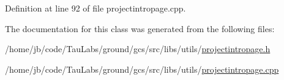 \-Definition at line 92 of file projectintropage.\-cpp.



\-The documentation for this class was generated from the following files\-:\begin{DoxyCompactItemize}
\item 
/home/jb/code/\-Tau\-Labs/ground/gcs/src/libs/utils/\hyperlink{projectintropage_8h}{projectintropage.\-h}\item 
/home/jb/code/\-Tau\-Labs/ground/gcs/src/libs/utils/\hyperlink{projectintropage_8cpp}{projectintropage.\-cpp}\end{DoxyCompactItemize}
